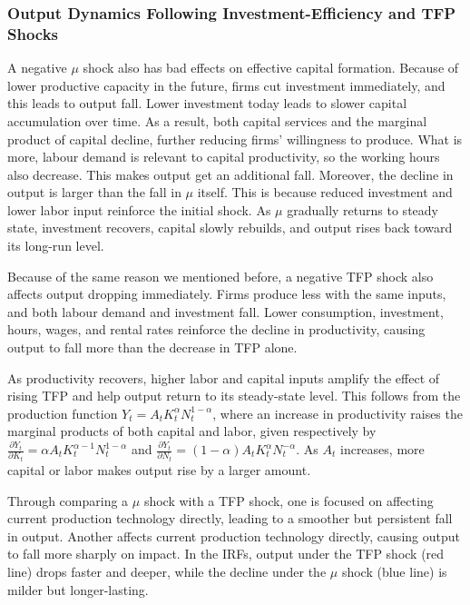 \documentclass[12pt]{article}
\begin{document}
\subsubsection{Output Dynamics Following Investment-Efficiency and TFP Shocks}
A negative $\mu$ shock also has bad effects on effective capital formation. Because of lower productive capacity in the future, firms cut investment immediately, and this leads to output fall. Lower investment today leads to slower capital accumulation over time. As a result, both capital services and the marginal product of capital decline, further reducing firms’ willingness to produce. What is more, labour demand is relevant to capital productivity, so the working hours also decrease. This makes output get an additional fall. Moreover, the decline in output is larger than the fall in $\mu$ itself. This is because reduced investment and lower labor input reinforce the initial shock. As $\mu$ gradually returns to steady state, investment recovers, capital slowly rebuilds, and output rises back toward its long-run level.

Because of the same reason we mentioned before, a negative TFP shock also affects output dropping immediately. Firms produce less with the same inputs, and both labour demand and investment fall. Lower consumption, investment, hours, wages, and rental rates reinforce the decline in productivity, causing output to fall more than the decrease in TFP alone.

As productivity recovers, higher labor and capital inputs amplify the effect of rising TFP and help output return to its steady-state level. This follows from the production function $Y_t = A_t K_t^{\alpha} N_t^{1-\alpha}$, where an increase in productivity raises the marginal products of both capital and labor, given respectively by $\frac{\partial Y_t}{\partial K_t} = \alpha A_t K_t^{\alpha-1} N_t^{1-\alpha}$ and $\frac{\partial Y_t}{\partial N_t} = (1-\alpha) A_t K_t^{\alpha} N_t^{-\alpha}$.  As $A_t$ increases, more capital or labor makes output rise by a larger amount.

Through comparing a $\mu$ shock with a TFP shock, one is focused on affecting current production technology directly, leading to a smoother but persistent fall in output. Another affects current production technology directly, causing output to fall more sharply on impact. In the IRFs, output under the TFP shock (red line) drops faster and deeper, while the decline under the $\mu$ shock (blue line) is milder but longer-lasting.
\end{document}
